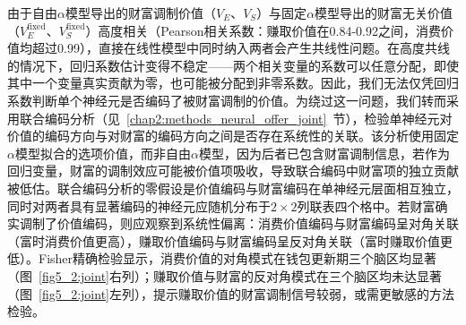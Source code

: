 由于自由$\alpha$模型导出的财富调制价值（$V_E$、$V_S$）与固定$\alpha$模型导出的财富无关价值（$V_E^{\mathrm{fixed}}$、$V_S^{\mathrm{fixed}}$）高度相关（Pearson相关系数：赚取价值在0.84-0.92之间，消费价值均超过0.99），直接在线性模型中同时纳入两者会产生共线性问题。在高度共线的情况下，回归系数估计变得不稳定——两个相关变量的系数可以任意分配，即使其中一个变量真实贡献为零，也可能被分配到非零系数。因此，我们无法仅凭回归系数判断单个神经元是否编码了被财富调制的价值。为绕过这一问题，我们转而采用联合编码分析（见~\ref{chap2:methods_neural_offer_joint}~节），检验单神经元对价值的编码方向与对财富的编码方向之间是否存在系统性的关联。该分析使用固定$\alpha$模型拟合的选项价值，而非自由$\alpha$模型，因为后者已包含财富调制信息，若作为回归变量，财富的调制效应可能被价值项吸收，导致联合编码中财富项的独立贡献被低估。联合编码分析的零假设是价值编码与财富编码在单神经元层面相互独立，同时对两者具有显著编码的神经元应随机分布于$2\times2$列联表四个格中。若财富确实调制了价值编码，则应观察到系统性偏离：消费价值编码与财富编码呈对角关联（富时消费价值更高），赚取价值编码与财富编码呈反对角关联（富时赚取价值更低）。Fisher精确检验显示，消费价值的对角模式在钱包更新期三个脑区均显著（图~\ref{fig5_2:joint}右列）；赚取价值与财富的反对角模式在三个脑区均未达显著（图~\ref{fig5_2:joint}左列），提示赚取价值的财富调制信号较弱，或需更敏感的方法检验。

